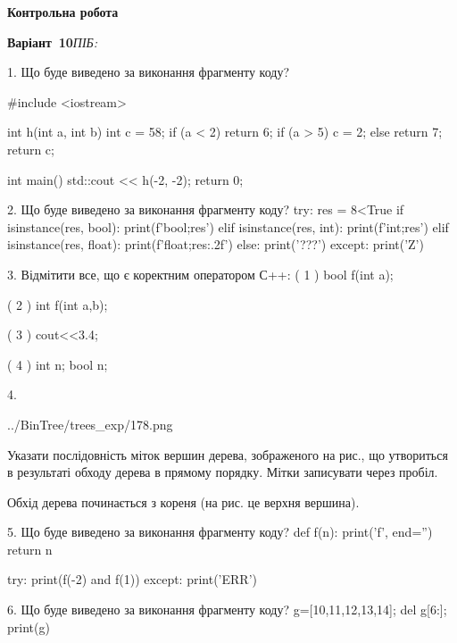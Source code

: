 \documentclass[11pt]{article}
\begin{document}
{\large\textbf{Контрольна робота}}

\textbf{Варіант \No\,10}\hfill \textit{ПІБ:}\,\underline{\hspace{60mm}}
\vspace{4mm}

1. Що буде виведено за виконання фрагменту коду?

#include <iostream>

int h(int a, int b){
    int c = 58;
    if (a < 2)
        return 6;
    if (a > 5)
         c = 2;
    else 
        return 7;
    return c;
}

int main(){
    std::cout << h(-2, -2);
    return 0;
}
\vspace{5mm}

2. Що буде виведено за виконання фрагменту коду?
try:
    res = 8<True
    if isinstance(res, bool):
        print(f'bool;{res}')
    elif isinstance(res, int):
        print(f'int;{res}')
    elif isinstance(res, float):
        print(f'float;{res:.2f}')
    else:
        print('???')
except:
    print('Z')
\vspace{5mm}

3. %
Відмітити все, що є коректним оператором С++:
( 1 ) bool f(int a);

( 2 ) int f(int a,b);

( 3 ) cout<<3.4;

( 4 ) int n; bool n;
\vspace{5mm}

4. 

\begin{center}
	{../BinTree/trees_exp/178.png}
\end{center}
Указати послідовність міток вершин дерева, зображеного на рис., що утвориться в результаті обходу дерева в прямому порядку. Мітки записувати через пробіл.\par Обхід дерева починається з кореня (на рис. це верхня вершина).
\vspace{5mm}

5. Що буде виведено за виконання фрагменту коду?
def f(n):
    print('f', end='')
    return n

try:
    print(f(-2) and f(1))
except:
    print('ERR')
\vspace{5mm}

6. Що буде виведено за виконання фрагменту коду?
g=[10,11,12,13,14]; del g[6:]; print(g)\vspace{5mm}
\end{document}
